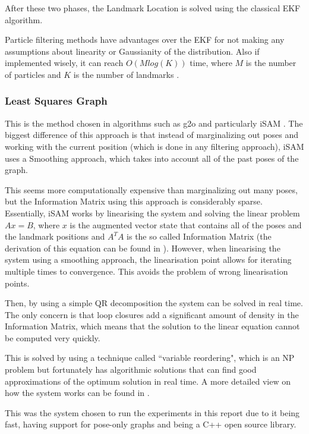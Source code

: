 \documentclass[11pt]{article}
\begin{document}
After these two phases, the Landmark Location is solved using the classical EKF algorithm.
	 
Particle filtering methods have advantages over the EKF for not making any assumptions about linearity or Gaussianity of the distribution. Also if implemented wisely, it can reach $O(Mlog(K))$ time, where $M$ is the number of particles and $K$ is the number of landmarks \cite{Montemerlo02fastslam:a}.
	 
	\subsubsection{Least Squares Graph}
This is the method chosen in algorithms such as g2o \cite{kummerle2011g} and particularly iSAM \cite{Kaess08tro}. The biggest difference of this approach is that instead of marginalizing out poses and working with the current position (which is done in any filtering approach), iSAM uses a Smoothing approach, which takes into account all of the past poses of the graph.

This seems more computationally expensive than marginalizing out many poses, but the Information Matrix using this approach is considerably sparse. Essentially, iSAM works by linearising the system and solving the linear problem $Ax = B$, where $x$ is the augmented vector state that contains all of the poses and the landmark positions and $A^TA$ is the so called Information Matrix (the derivation of this equation can be found in \cite{Kaess08tro}). However, when linearising the system using a smoothing approach, the linearisation point allows for iterating multiple times to convergence. This avoids the problem of wrong linearisation points.

Then, by using a simple QR decomposition the system can be solved in real time. The only concern is that loop closures add a significant amount of density in the Information Matrix, which means that the solution to the linear equation cannot be computed very quickly.

This is solved by using a technique called ``variable reordering", which is an NP problem but fortunately has algorithmic solutions that can find good approximations of the optimum solution in real time. A more detailed view on how the system works can be found in \cite{Kaess08tro}.

This was the system chosen to run the experiments in this report due to it being fast, having support for pose-only graphs and being a C++ open source library.
\end{document}
